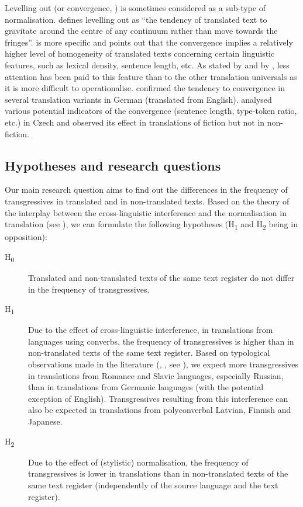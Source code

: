 \documentclass[output=paper,russian]{langsci/langscibook}
\begin{document}
Levelling out (or convergence, \cite{laviosa02}) is sometimes considered as a sub-type of normalisation. \textcite[177]{baker96} defines levelling out as \enquote{the tendency of translated text to gravitate around the centre of any continuum rather than move towards the fringes}. \textcite[71]{laviosa02} is more specific and points out that the convergence implies a relatively higher level of homogeneity of translated texts concerning certain linguistic features, such as lexical density, sentence length, etc. As stated by \textcite[184]{baker96} and by \textcite[104]{chlumska17}, less attention has been paid to this feature than to the other translation universals as it is more difficult to operationalise. \textcite{lapshinova15} confirmed the tendency to convergence in several translation variants in German (translated from English). \textcite[104--121]{chlumska17} analysed various potential indicators of the convergence (sentence length, type-token ratio, etc.) in Czech and observed its effect in translations of fiction but not in non-fiction.

\subsection{Hypotheses and research questions}\label{olga:hyp}

Our main research question aims to find out the differences in the frequency of transgressives in translated and in non-translated texts. Based on the theory of the interplay between the cross-linguistic interference and the normalisation in translation (see ), we can formulate the following hypotheses (H\textsubscript{1} and H\textsubscript{2} being in opposition):

\begin{description}
  \item[H\textsubscript{0}] Translated and non-translated texts of the same text register do not differ in the frequency of transgressives.
  \item[H\textsubscript{1}] Due to the effect of cross-linguistic interference, in translations from languages using converbs, the frequency of transgressives is higher than in non-translated texts of the same text register. Based on typological observations made in the literature (\cite{haspelmath95}, \cite{nedjalkov95}, see ), we expect more transgressives in translations from Romance and Slavic languages, especially Russian, than in translations from Germanic languages (with the potential exception of English). Transgressives resulting from this interference can also be expected in translations from polyconverbal Latvian, Finnish and Japanese.
  \item[H\textsubscript{2}] Due to the effect of (stylistic) normalisation, the frequency of transgressives is lower in translations than in non-translated texts of the same text register (independently of the source language and the text register).
\end{description}
\end{document}
